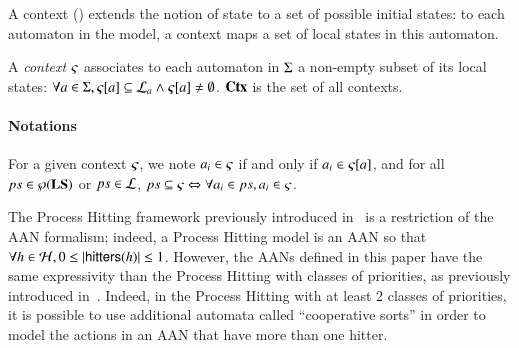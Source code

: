 A context () extends the notion of state to a set of possible initial states:
to each automaton in the model, a context maps a set of local states in this automaton.
\begin{definition}
\label{def:context}
  A \emph{context} $\varsigma$ associates to each automaton in $\Sigma$ a non-empty subset of its local states:
  $\forall a \in \Sigma, {\varsigma[a]} \subseteq \mathcal{L}_a \wedge {\varsigma[a]} \neq \emptyset$.
  $\mathbf{Ctx}$ is the set of all contexts.
\end{definition}

\paragraph{Notations}
For a given context $\varsigma$, we note $a_i \in \varsigma$ if and only if $a_i \in {\varsigma[a]}$,
and for all $ps \in \wp(\mathbf{LS})$ or $ps \in \mathcal{L}$, $ps \subseteq \varsigma \Leftrightarrow \forall a_i \in ps, a_i \in \varsigma$.



\begin{remark}
  The Process Hitting framework
  previously introduced in~\cite{PMR10-TCSB}
  is a restriction of the AAN formalism;
  indeed, a Process Hitting model is an AAN so that
  $\forall h \in \mathcal{H}, 0 \leq |\mathsf{hitters}(h)| \leq 1$.
  However, the AANs defined in this paper have the same expressivity than
  the Process Hitting with classes of priorities, as previously
  introduced in~\cite{FPMR13-CS2Bio}.
  Indeed, in the Process Hitting with at least 2 classes of priorities,
  it is possible to use additional automata called “cooperative sorts”
  in order to model the actions in an AAN that have more than one hitter.
\end{remark}

